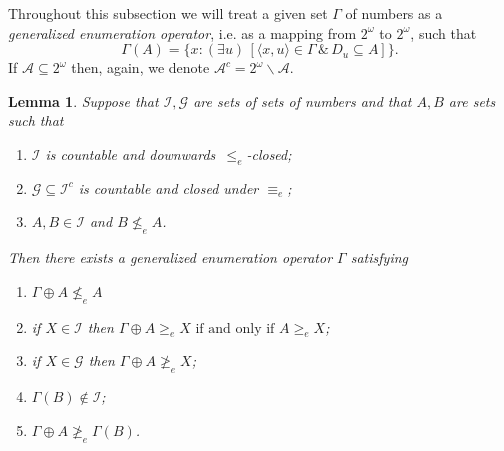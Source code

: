 \documentclass[11pt]{amsart}
\newtheorem{lemma}[theorem]{Lemma}
\newcommand{\QE}[1]{(\exists{#1})\,}
\begin{document}
Throughout this subsection we will treat a given set $\Gamma$ of numbers as a 
\emph{generalized enumeration operator}, i.e. as a mapping from $2^\omega$ to 
$2^\omega$, such that 
\[
\Gamma(A)=\{x: \QE{u}[\langle x,u\rangle \in \Gamma \,\&\, D_u \subseteq A]\}.
\]
If $\mathcal{A} \subseteq 2^\omega$ then, again, we denote $\mathcal{A}^c= 
2^\omega \smallsetminus \mathcal{A}$.
 
\begin{lemma}\label{lem:a-splitting}
Suppose that $\mathcal{I},\mathcal{G}$ are sets of sets of numbers and 
that $A, B$ are sets such that 

\begin{enumerate}
  \item[(a)] $\mathcal{I}$ is countable and downwards~$\leq_e$-closed;
  \item[(b)] $\mathcal{G} \subseteq \mathcal{I}^c$ is countable and closed 
      under $\equiv_e$; 
  \item[(c)] $A, B \in \mathcal{I}$ and $B \nleq_e A$. 
\end{enumerate} 

Then there exists a generalized enumeration operator $\Gamma$ satisfying 

\begin{enumerate}
  \item[(0)] $\Gamma \oplus A \nleq_e A$
  \item if $X \in \mathcal{I}$ then $\Gamma \oplus A\geq_e X \textrm{ if 
      and only if } A \geq_e X$; 
  \item if $X \in \mathcal{G}$ then $\Gamma \oplus A \ngeq_e X$; 
  \item $\Gamma(B) \notin \mathcal{I}$;
  \item $\Gamma\oplus A \ngeq_e \Gamma(B)$.
\end{enumerate}
\end{lemma}
\end{document}
